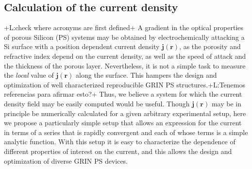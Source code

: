 \documentclass{article}
\newcommand{\notaL}[1]{{\color{blue}+L:#1+}}
\begin{document}
\subsection{Calculation of the current density}
\label{sec:calc-curr-dens}
\notaL{check where acronyms are first defined}
A gradient in the optical properties of porous Silicon (PS) systems may be
obtained by electrochemically attacking a Si surface with a position dependent current
density ${\bm j(\bm r)}$, as the porosity and refractive index depend on
the current density, as well as the speed of attack and the thickness of the
porous layer. Nevertheless, it is not a simple task to measure the
{\em local} value of $\bm j(\bm r)$ along the surface. This hampers the
design and optimization of well characterized reproducible GRIN PS
structures.\notaL{Tenemos referencias para afirmar esto?} Thus, we
believe a
system for which the current density field may be
easily computed would be useful.
Though $\bm j(\bm r)$ may be in principle be numerically calculated for a
given arbitrary experimental setup,  here we propose a particularly
simple setup that allows an expression for the current in terms
of a series that is rapidly convergent and each of whose terms is a
simple analytic function. With this setup it is easy to characterize
the dependence of different properties of interest on the current, and
this allows the design and optimization of diverse GRIN PS devices.
\end{document}
